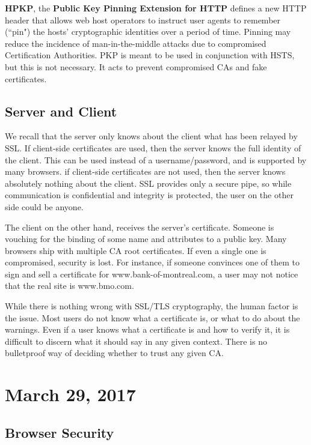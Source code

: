 \documentclass[11pt]{article}
\theoremstyle{plain} %
\theoremstyle{definition}
\theoremstyle{example}
\theoremstyle{remark}
\begin{document}
\textbf{HPKP}, the \textbf{Public Key Pinning Extension for HTTP} defines a new HTTP header that allows web host operators to instruct user agents to remember (``pin") the hosts' cryptographic identities over a period of time. Pinning may reduce the incidence of man-in-the-middle attacks due to compromised Certification Authorities. PKP is meant to be used in conjunction with HSTS, but this is not necessary. It acts to prevent compromised CAs and fake certificates. 

\subsection{Server and Client}

We recall that the server only knows about the client what has been relayed by SSL. If client-side certificates are used, then the server knows the full identity of the client. This can be used instead of a username/password, and is supported by many browsers. if client-side certificates are not used, then the server knows absolutely nothing about the client. SSL provides only a secure pipe, so while communication is confidential and integrity is protected, the user on the other side could be anyone. 

The client on the other hand, receives the server's certificate. Someone is vouching for the binding of some name and attributes to a public key. Many browsers ship with multiple CA root certificates. If even a single one is compromised, security is lost. For instance, if someone convinces one of them to sign and sell a certificate for www.bank-of-montreal.com, a user may not notice that the real site is www.bmo.com.

While there is nothing wrong with SSL/TLS cryptography, the human factor is the issue. Most users do not know what a certificate is, or what to do about the warnings. Even if a user knows what a certificate is and how to verify it, it is difficult to discern what it should say in any given context. There is no bulletproof way of deciding whether to trust any given CA. 

\section{March 29, 2017}
\subsection{Browser Security}
\end{document}
